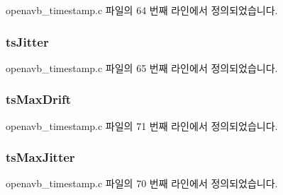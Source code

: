 openavb\+\_\+timestamp.\+c 파일의 64 번째 라인에서 정의되었습니다.

\subsubsection[{\texorpdfstring{ts\+Jitter}{tsJitter}}]{ ts\+Jitter}\hypertarget{structopenavb__timestamp__eval_aed1adf16f22f83d5e3dc570c70572c85}{}\label{structopenavb__timestamp__eval_aed1adf16f22f83d5e3dc570c70572c85}


openavb\+\_\+timestamp.\+c 파일의 65 번째 라인에서 정의되었습니다.

\subsubsection[{\texorpdfstring{ts\+Max\+Drift}{tsMaxDrift}}]{ ts\+Max\+Drift}\hypertarget{structopenavb__timestamp__eval_a3bd5d77cfe79675562f49f399572d4d6}{}\label{structopenavb__timestamp__eval_a3bd5d77cfe79675562f49f399572d4d6}


openavb\+\_\+timestamp.\+c 파일의 71 번째 라인에서 정의되었습니다.

\subsubsection[{\texorpdfstring{ts\+Max\+Jitter}{tsMaxJitter}}]{ ts\+Max\+Jitter}\hypertarget{structopenavb__timestamp__eval_a1cdfd1424f1cf707d0ccfe076858f0a9}{}\label{structopenavb__timestamp__eval_a1cdfd1424f1cf707d0ccfe076858f0a9}


openavb\+\_\+timestamp.\+c 파일의 70 번째 라인에서 정의되었습니다.

